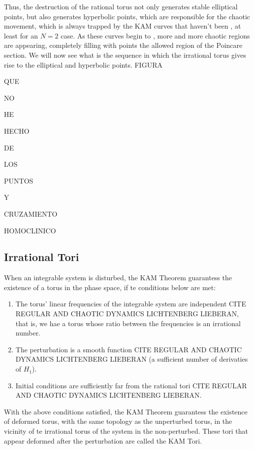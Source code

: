 Thus, the destruction of the rational torus not only generates stable elliptical points, but also generates hyperbolic points, which are responsible for the chaotic movement, which is always trapped by the KAM curves that haven't been  \cite{ottChaosDynamicalSystems2002}, at least for an $N=2$ case. As these curves begin to , more and more chaotic regions are appearing, completely filling with points the allowed region of the Poincar\´e section. We will now see what is the sequence in which the irrational torus gives rise to the elliptical and hyperbolic points.
FIGURA\par
QUE\par
NO\par
HE\par
HECHO\par
DE\par
LOS\par
PUNTOS\par
Y\par
CRUZAMIENTO\par
HOMOCLINICO\par





\subsection{Irrational Tori}
When an integrable system is disturbed, the KAM Theorem guarantess the existence of a torus in the phase space, if te conditions below are met:
\begin{enumerate}
\item The torus' linear frequencies of the integrable system are independent	 CITE REGULAR AND CHAOTIC DYNAMICS LICHTENBERG LIEBERAN, that is, we hae a torus whose ratio between the frequencies is an irrational number.
\item The perturbation is a smooth function CITE REGULAR AND CHAOTIC DYNAMICS LICHTENBERG LIEBERAN (a sufficient number of derivaties of $H_1$).
\item Initial conditions are sufficiently far from the rational tori CITE REGULAR AND CHAOTIC DYNAMICS LICHTENBERG LIEBERAN.
\end{enumerate}
With the above conditions satisfied, the KAM Theorem guarantess the existence of deformed torus, with the same topology as the unperturbed torus, in the vicinity of te irrational torus of the system in the non-perturbed. These tori that appear deformed after the perturbation are called the KAM Tori.\par

